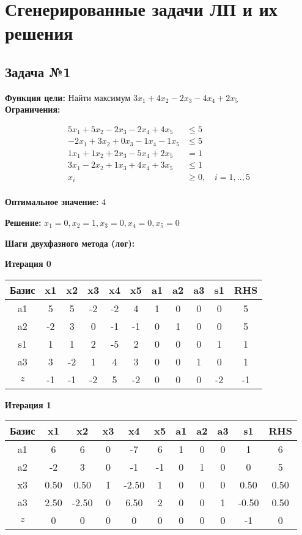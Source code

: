 \documentclass[a4paper,12pt]{article}
\begin{document}
\section*{Сгенерированные задачи ЛП и их решения}

\subsection*{Задача №1}
\textbf{Функция цели: }
Найти максимум $ 3x_{1} +4x_{2} -2x_{3} -4x_{4} +2x_{5} $\\

\textbf{Ограничения:}

\[ \begin{aligned}
5x_{1} +5x_{2} -2x_{3} -2x_{4} +4x_{5} &\le 5 \\
-2x_{1} +3x_{2} +0x_{3} -1x_{4} -1x_{5} &\le 5 \\
1x_{1} +1x_{2} +2x_{3} -5x_{4} +2x_{5} &= 1 \\
3x_{1} -2x_{2} +1x_{3} +4x_{4} +3x_{5} &\le 1 \\
x_i &\ge 0,\quad i=1,..,5\\
\end{aligned}\]

\textbf{Оптимальное значение: }$4$

\textbf{Решение: }$x_{1}=0, x_{2}=1, x_{3}=0, x_{4}=0, x_{5}=0$

\textbf{Шаги двухфазного метода (лог):}


 \textbf{Итерация 0}\\
\begin{tabular}{|c|c|c|c|c|c|c|c|c|c|c|}
\hline
Базис & x1 & x2 & x3 & x4 & x5 & a1 & a2 & a3 & s1 & RHS \\ \hline
a1 & 5 & 5 & -2 & -2 & 4 & 1 & 0 & 0 & 0 & 5 \\ \hline
a2 & -2 & 3 & 0 & -1 & -1 & 0 & 1 & 0 & 0 & 5 \\ \hline
s1 & 1 & 1 & 2 & -5 & 2 & 0 & 0 & 0 & 1 & 1 \\ \hline
a3 & 3 & -2 & 1 & 4 & 3 & 0 & 0 & 1 & 0 & 1 \\ \hline
$z$ & -1 & -1 & -2 & 5 & -2 & 0 & 0 & 0 & -2 & -1 \\ \hline
\end{tabular}
\vspace{5mm}

 \textbf{Итерация 1}\\
\begin{tabular}{|c|c|c|c|c|c|c|c|c|c|c|}
\hline
Базис & x1 & x2 & x3 & x4 & x5 & a1 & a2 & a3 & s1 & RHS \\ \hline
a1 & 6 & 6 & 0 & -7 & 6 & 1 & 0 & 0 & 1 & 6 \\ \hline
a2 & -2 & 3 & 0 & -1 & -1 & 0 & 1 & 0 & 0 & 5 \\ \hline
x3 & 0.50 & 0.50 & 1 & -2.50 & 1 & 0 & 0 & 0 & 0.50 & 0.50 \\ \hline
a3 & 2.50 & -2.50 & 0 & 6.50 & 2 & 0 & 0 & 1 & -0.50 & 0.50 \\ \hline
$z$ & 0 & 0 & 0 & 0 & 0 & 0 & 0 & 0 & -1 & 0 \\ \hline
\end{tabular}
\vspace{5mm}
\end{document}
